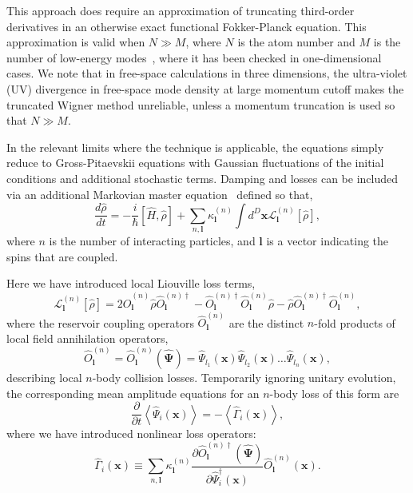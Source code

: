 \documentclass[aps,prl,twocolumn,showpacs,amsmath,amssymb,superscriptaddress,flushbottom,noraggedfooter]{revtex4-1}
\newcommand{\xvec}{\boldsymbol{x}}
\newcommand{\lvec}{\boldsymbol{l}}
\newcommand{\Psivec}{\boldsymbol{\Psi}}
\begin{document}
This approach does require an approximation of truncating third-order derivatives
in an otherwise exact functional Fokker-Planck equation.
This approximation is valid when $N \gg M$, where $N$ is the atom number and
$M$ is the number of low-energy modes~\cite{Drummond1993,Sinatra2002,Norrie2006},
where it has been checked in one-dimensional cases.
We note that in free-space calculations in three dimensions,
the ultra-violet (UV) divergence in free-space mode density at large momentum cutoff
makes the truncated Wigner method unreliable,
unless a momentum truncation is used so that $N \gg M$.

In the relevant limits where the technique is applicable,
the equations simply reduce to Gross-Pitaevskii equations with Gaussian fluctuations
of the initial conditions and additional stochastic terms.
Damping and losses can be included via an additional Markovian master equation~\cite{Jack2002}
defined so that,
\begin{equation}
	\frac{d\hat{\rho}}{dt} = -\frac{i}{\hbar} \left[ \hat{H}, \hat{\rho} \right] +
	\sum_{n,\lvec} \kappa_{\lvec}^{(n)}
	\int d^D\xvec \mathcal{L}_{\lvec}^{(n)} \left[ \hat{\rho} \right],
\end{equation}
where $n$ is the number of interacting particles,
and $\lvec$ is a vector indicating the spins that are coupled.

Here we have introduced local Liouville loss terms,
\begin{equation}
	\mathcal{L}_{\lvec}^{(n)} \left[ \hat{\rho}\right] =
	2 \hat{O}_{\lvec}^{(n)} \hat{\rho}\hat{O}_{\lvec}^{(n)\dagger} -
	\hat{O}_{\lvec}^{(n)\dagger}\hat{O}_{\lvec}^{(n)}\hat{\rho} -
	\hat{\rho}\hat{O}_{\lvec}^{(n)\dagger}\hat{O}_{\lvec}^{(n)},
\end{equation}
where the reservoir coupling operators $\hat{O}_{\lvec}^{(n)}$
are the distinct $n$-fold products of local field annihilation operators,
\begin{equation}
	\hat{O}_{\lvec}^{(n)} =
	\hat{O}_{\lvec}^{(n)} \left( \widehat{\Psivec} \right) =
	\widehat{\Psi}_{l_{1}} \left( \xvec \right)
	\widehat{\Psi}_{l_{2}} \left( \xvec \right) \ldots
	\widehat{\Psi}_{l_{n}} \left( \xvec \right),
\end{equation}
describing local $n$-body collision losses.
Temporarily ignoring unitary evolution, the corresponding mean amplitude equations
for an $n$-body loss of this form are
\begin{equation}
	\frac{\partial}{\partial t} \left\langle
		\widehat{\Psi}_{i} \left( \xvec \right)
	\right\rangle =
	-\left\langle \hat{\Gamma}_{i} \left( \xvec \right) \right\rangle ,
\end{equation}
where we have introduced  nonlinear loss operators:
\begin{equation}
	\hat{\Gamma}_{i} \left( \xvec \right) \equiv
	\sum_{n,\lvec} \kappa_{\lvec}^{(n)}
	\frac{\partial\hat{O}_{\lvec}^{(n)\dagger}	\left( \widehat{\Psivec} \right)}
		{\partial \hat{\Psi}_{i}^{\dagger} \left( \xvec \right)}
	\hat{O}_{\lvec}^{(n)} \left( \xvec \right) .
\end{equation}
\end{document}
